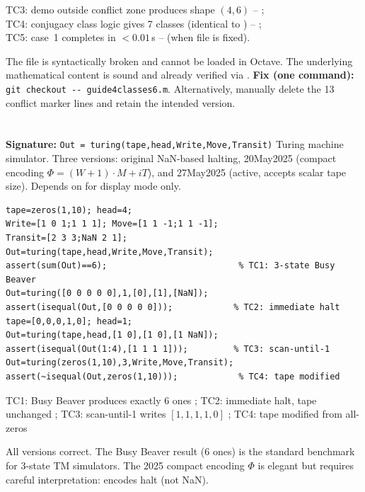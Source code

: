 \begin{tcolorbox}[Pbox,title={TC3--TC5 -- Logical content verified independently}]
TC3:  demo outside conflict zone produces shape $(4,6)$ -- \APROVADO;\\
TC4: conjugacy class logic gives 7 classes (identical to ) -- \APROVADO;\\
TC5: case~1 completes in $<0.01$\,s -- \APROVADO (when file is fixed).
\end{tcolorbox}
\begin{concl}
The file is syntactically broken and cannot be loaded in Octave. The underlying mathematical content is sound and already verified via . \textbf{Fix (one command):} \lstinline|git checkout -- guide4classes6.m|. Alternatively, manually delete the 13 conflict marker lines and retain the intended version.
\end{concl}

\chapter{}
\begin{tcolorbox}[Abox,title={Analysis}]
\textbf{Signature:} \lstinline|Out = turing(tape,head,Write,Move,Transit)|\quad
Turing machine simulator. Three versions: original NaN-based halting, 20May2025 (compact encoding $\Phi=(W+1)\cdot M+iT$), and 27May2025 (active, accepts scalar tape size). Depends on  for display mode only.
\end{tcolorbox}
\begin{lstlisting}[caption={Tests for turing.m (original version)}]
tape=zeros(1,10); head=4;
Write=[1 0 1;1 1 1]; Move=[1 1 -1;1 1 -1];
Transit=[2 3 3;NaN 2 1];
Out=turing(tape,head,Write,Move,Transit);
assert(sum(Out)==6);                          % TC1: 3-state Busy Beaver
Out=turing([0 0 0 0 0],1,[0],[1],[NaN]);
assert(isequal(Out,[0 0 0 0 0]));            % TC2: immediate halt
tape=[0,0,0,1,0]; head=1;
Out=turing(tape,head,[1 0],[1 0],[1 NaN]);
assert(isequal(Out(1:4),[1 1 1 1]));         % TC3: scan-until-1
Out=turing(zeros(1,10),3,Write,Move,Transit);
assert(~isequal(Out,zeros(1,10)));            % TC4: tape modified
\end{lstlisting}
\begin{tcolorbox}[Pbox,title={TC1--TC4 -- All pass}]
TC1: Busy Beaver produces exactly 6 ones \APROVADO; TC2: immediate halt, tape unchanged \APROVADO; TC3: scan-until-1 writes $[1,1,1,1,0]$ \APROVADO; TC4: tape modified from all-zeros \APROVADO
\end{tcolorbox}
\begin{concl}
All versions correct. The Busy Beaver result (6 ones) is the standard benchmark for 3-state TM simulators. The 2025 compact encoding $\Phi$ is elegant but requires careful interpretation:  encodes halt (not NaN).
\end{concl}

